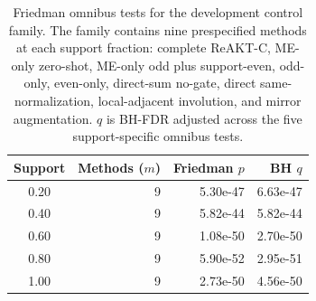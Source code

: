 \begin{table}[H]
\caption{Friedman omnibus tests for the development control family. The family contains nine prespecified methods at each support fraction: complete ReAKT-C, ME-only zero-shot, ME-only odd plus support-even, odd-only, even-only, direct-sum no-gate, direct same-normalization, local-adjacent involution, and mirror augmentation. $q$ is BH-FDR adjusted across the five support-specific omnibus tests.}
\label{tab:friedman_fdr}
\centering\scriptsize
\begin{tabular}{c r r r}
\toprule
Support & Methods ($m$) & Friedman $p$ & BH $q$\\
\midrule
0.20 & 9 & 5.30e-47 & 6.63e-47\\
0.40 & 9 & 5.82e-44 & 5.82e-44\\
0.60 & 9 & 1.08e-50 & 2.70e-50\\
0.80 & 9 & 5.90e-52 & 2.95e-51\\
1.00 & 9 & 2.73e-50 & 4.56e-50\\
\bottomrule
\end{tabular}
\end{table}
